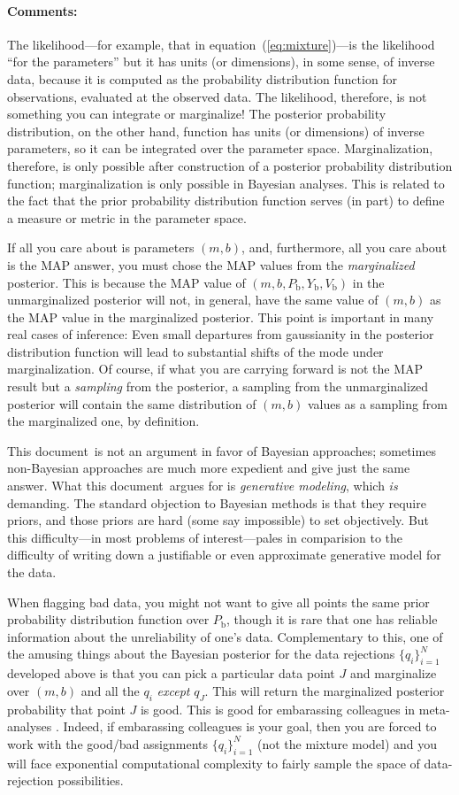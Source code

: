 \documentclass[12pt,twoside]{article}
\newcommand{\documentname}{document}
\newcommand{\commentsname}{Comments}
\newcounter{problem}
\newenvironment{comments}{\paragraph{\commentsname:}}{}
\newcommand{\setofall}[3]{\{{#1}\}_{{#2}}^{{#3}}}
\newcommand{\allq}{\setofall{q_i}{i=1}{N}}
\newcommand{\Pbad}{P_{\mathrm{b}}}
\newcommand{\Ybad}{Y_{\mathrm{b}}}
\newcommand{\Vbad}{V_{\mathrm{b}}}
\begin{document}
\begin{comments}
The likelihood---for example, that in equation~(\ref{eq:mixture})---is
the likelihood ``for the parameters'' but it has units (or
dimensions), in some sense, of inverse data, because it is computed as
the probability distribution function for observations, evaluated at
the observed data.  The likelihood, therefore, is not something you
can integrate or marginalize!  The posterior probability distribution,
on the other hand, function has units (or dimensions) of inverse
parameters, so it can be integrated over the parameter space.
Marginalization, therefore, is only possible after construction of a
posterior probability distribution function; marginalization is only
possible in Bayesian analyses.  This is related to the fact that the
prior probability distribution function serves (in part) to define a
measure or metric in the parameter space.

If all you care about is parameters $(m,b)$, and, furthermore, all you
care about is the MAP answer, you must chose the MAP values from the
\emph{marginalized} posterior.  This is because the MAP value of
$(m,b,\Pbad,\Ybad,\Vbad)$ in the unmarginalized posterior will not, in
general, have the same value of $(m,b)$ as the MAP value in the
marginalized posterior.  This point is important in many real cases of
inference: Even small departures from gaussianity in the posterior
distribution function will lead to substantial shifts of the mode
under marginalization.  Of course, if what you are carrying forward is
not the MAP result but a \emph{sampling} from the posterior, a
sampling from the unmarginalized posterior will contain the same
distribution of $(m,b)$ values as a sampling from the marginalized
one, by definition.

This \documentname\ is not an argument in favor of Bayesian
approaches; sometimes non-Bayesian approaches are much more expedient
and give just the same answer.  What this \documentname\ argues for is
\emph{generative modeling}, which \emph{is} demanding.  The standard
objection to Bayesian methods is that they require priors, and those
priors are hard (some say impossible) to set objectively.  But this
difficulty---in most problems of interest---pales in comparision to
the difficulty of writing down a justifiable or even approximate
generative model for the data.

When flagging bad data, you might not want to give all points the same
prior probability distribution function over $\Pbad$, though it is
rare that one has reliable information about the unreliability of
one's data.  Complementary to this, one of the amusing things about
the Bayesian posterior for the data rejections $\allq$ developed above
is that you can pick a particular data point $J$ and marginalize over
$(m,b)$ and all the $q_i$ \emph{except} $q_J$.  This will return the
marginalized posterior probability that point $J$ is good.  This is
good for embarassing colleagues in meta-analyses \citep{pressH0}.
Indeed, if embarassing colleagues is your goal, then you are forced to
work with the good/bad assignments $\allq$ (not the mixture model) and
you will face exponential computational complexity to fairly sample
the space of data-rejection possibilities.


\end{comments}
\end{document}
